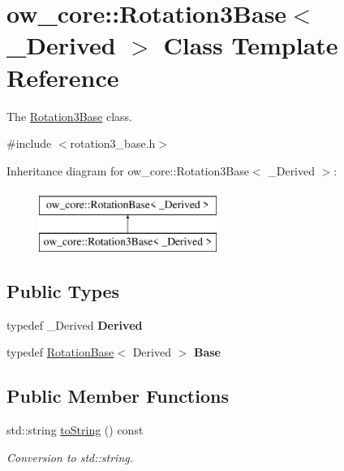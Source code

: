 \hypertarget{classow__core_1_1Rotation3Base}{}\section{ow\+\_\+core\+:\+:Rotation3\+Base$<$ \+\_\+\+Derived $>$ Class Template Reference}
\label{classow__core_1_1Rotation3Base}


The \hyperlink{classow__core_1_1Rotation3Base}{Rotation3\+Base} class.  




{\ttfamily \#include $<$rotation3\+\_\+base.\+h$>$}

Inheritance diagram for ow\+\_\+core\+:\+:Rotation3\+Base$<$ \+\_\+\+Derived $>$\+:\begin{figure}[H]
\begin{center}
\leavevmode
\includegraphics[height=2.000000cm]{dd/d1c/classow__core_1_1Rotation3Base}
\end{center}
\end{figure}
\subsection*{Public Types}
\begin{DoxyCompactItemize}
\item 
typedef \+\_\+\+Derived {\bfseries Derived}\hypertarget{classow__core_1_1Rotation3Base_a54ad5569bf644cdee36e1dc28677591a}{}\label{classow__core_1_1Rotation3Base_a54ad5569bf644cdee36e1dc28677591a}

\item 
typedef \hyperlink{classow__core_1_1RotationBase}{Rotation\+Base}$<$ Derived $>$ {\bfseries Base}\hypertarget{classow__core_1_1Rotation3Base_a92b714c5daa1ac2d57bd9dd5426772d3}{}\label{classow__core_1_1Rotation3Base_a92b714c5daa1ac2d57bd9dd5426772d3}

\end{DoxyCompactItemize}
\subsection*{Public Member Functions}
\begin{DoxyCompactItemize}
\item 
std\+::string \hyperlink{classow__core_1_1Rotation3Base_ad7cee51d982d0094a7efdd5fb6b5406e}{to\+String} () const \hypertarget{classow__core_1_1Rotation3Base_ad7cee51d982d0094a7efdd5fb6b5406e}{}\label{classow__core_1_1Rotation3Base_ad7cee51d982d0094a7efdd5fb6b5406e}

\begin{DoxyCompactList}\small\item\em Conversion to std\+::string. \end{DoxyCompactList}\end{DoxyCompactItemize}


